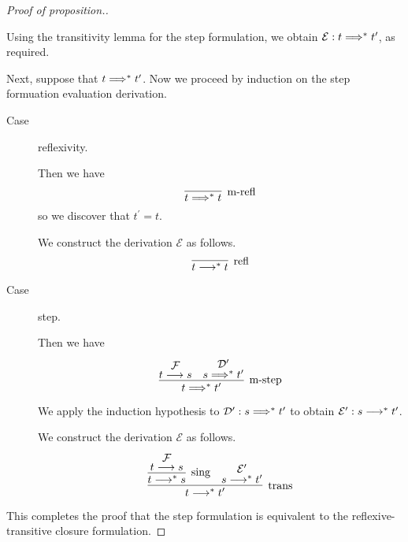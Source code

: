 \documentclass[11pt,letterpaper]{article}
\begin{document}
\begin{proof}[Proof of proposition.]
\begin{description}
            Using the transitivity lemma for the step formulation, we obtain
            $\mathcal{E} : t \Longrightarrow^* t^\prime$, as required.
    \end{description}

    Next, suppose that $t \Longrightarrow^* t^\prime$.
    Now we proceed by induction on the step formuation evaluation derivation.

    \begin{description}
        \item[Case] reflexivity.

            Then we have
            \begin{equation*}
                \infer[\text{m-refl}]{t \altevalto^* t}{}
            \end{equation*}
            so we discover that $t^\prime = t$.

            We construct the derivation $\mathcal{E}$ as follows.
            \begin{equation*}
                \infer[\text{refl}]{t \evalto^* t}{}
            \end{equation*}

        \item[Case] step.

            Then we have
            \begin{equation*}
                \infer[\text{m-step}]{
                    t \altevalto^* t^\prime
                }{
                    \deduce[\mathcal{F}]{t \evalto s}{}
                    &
                    \deduce[\mathcal{D}^\prime]{s \altevalto^* t^\prime}{}
                }
            \end{equation*}

            We apply the induction hypothesis to
            $\mathcal{D}^\prime : s \Longrightarrow^* t^\prime$
            to obtain
            $\mathcal{E}^\prime : s \longrightarrow^* t^\prime$.

            We construct the derivation $\mathcal{E}$ as follows.
            \begin{equation*}
                \infer[\text{trans}]{
                    t \evalto^* t^\prime
                }{
                    \infer[\text{sing}]{t \evalto^* s}{
                        \deduce[\mathcal{F}]{t \evalto s}{}
                    }
                    &
                    \deduce[\mathcal{E}^\prime]{s \evalto^* t^\prime}{}
                }
            \end{equation*}
    \end{description}

    This completes the proof that the step formulation is equivalent to the
    reflexive-transitive closure formulation.
\end{proof}
\end{document}
